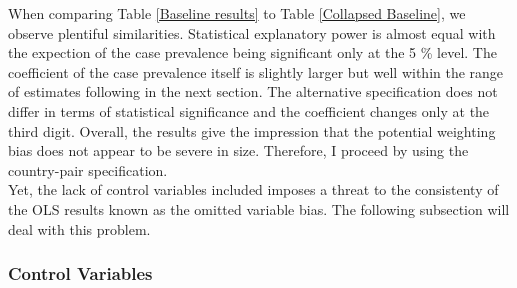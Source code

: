 \documentclass{article}
\begin{document}
When comparing Table \ref{Baseline results} to Table \ref{Collapsed Baseline}, we observe plentiful similarities. Statistical explanatory power is almost equal with the expection of the case prevalence being significant only at the 5 \% level. The coefficient of the case prevalence itself is slightly larger but well within the range of estimates following in the next section. The alternative specification does not differ in terms of statistical significance and the coefficient changes only at the third digit. Overall, the results give the impression that the potential weighting bias does not appear to be severe in size. Therefore, I proceed by using the country-pair specification. \\
Yet, the lack of control variables included imposes a threat to the consistenty of the OLS results known as the omitted variable bias. The following subsection will deal with this problem.

\subsubsection{Control Variables}
\end{document}
